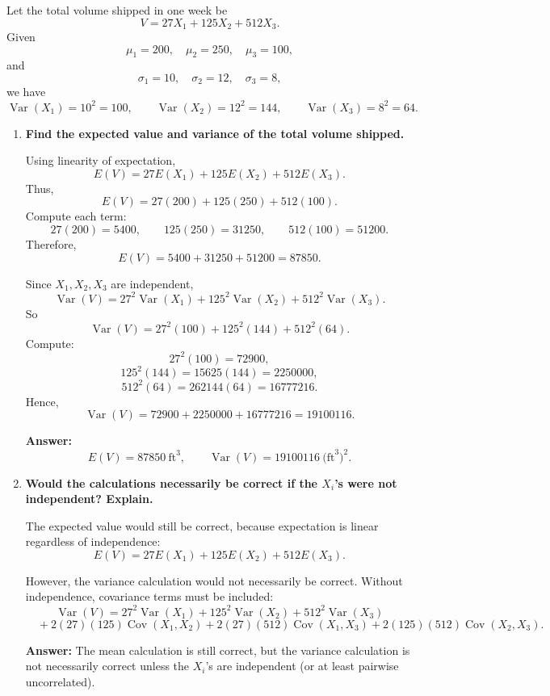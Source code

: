Let the total volume shipped in one week be
\[
V=27X_1+125X_2+512X_3.
\]
Given
\[
\mu_1=200,\quad \mu_2=250,\quad \mu_3=100,
\]
and
\[
\sigma_1=10,\quad \sigma_2=12,\quad \sigma_3=8,
\]
we have
\[
\operatorname{Var}(X_1)=10^2=100,\qquad
\operatorname{Var}(X_2)=12^2=144,\qquad
\operatorname{Var}(X_3)=8^2=64.
\]

\begin{enumerate}
    \item[(a)] \textbf{Find the expected value and variance of the total volume shipped.}

    Using linearity of expectation,
    \[
    E(V)=27E(X_1)+125E(X_2)+512E(X_3).
    \]
    Thus,
    \[
    E(V)=27(200)+125(250)+512(100).
    \]
    Compute each term:
    \[
    27(200)=5400,\qquad 125(250)=31250,\qquad 512(100)=51200.
    \]
    Therefore,
    \[
    E(V)=5400+31250+51200=87850.
    \]

    Since $X_1,X_2,X_3$ are independent,
    \[
    \operatorname{Var}(V)=27^2\operatorname{Var}(X_1)+125^2\operatorname{Var}(X_2)+512^2\operatorname{Var}(X_3).
    \]
    So
    \[
    \operatorname{Var}(V)=27^2(100)+125^2(144)+512^2(64).
    \]
    Compute:
    \[
    27^2(100)=72900,
    \]
    \[
    125^2(144)=15625(144)=2250000,
    \]
    \[
    512^2(64)=262144(64)=16777216.
    \]
    Hence,
    \[
    \operatorname{Var}(V)=72900+2250000+16777216=19100116.
    \]

    \textbf{Answer:}
    \[
    E(V)=87850\ \text{ft}^3,
    \qquad
    \operatorname{Var}(V)=19100116\ \text{(ft}^3)^2.
    \]

    \item[(b)] \textbf{Would the calculations necessarily be correct if the $X_i$'s were not independent? Explain.}

    The expected value would still be correct, because expectation is linear regardless of independence:
    \[
    E(V)=27E(X_1)+125E(X_2)+512E(X_3).
    \]

    However, the variance calculation would not necessarily be correct. Without independence, covariance terms must be included:
    \[
    \operatorname{Var}(V)=27^2\operatorname{Var}(X_1)+125^2\operatorname{Var}(X_2)+512^2\operatorname{Var}(X_3)
    \]
    \[
    \quad +2(27)(125)\operatorname{Cov}(X_1,X_2)
    +2(27)(512)\operatorname{Cov}(X_1,X_3)
    +2(125)(512)\operatorname{Cov}(X_2,X_3).
    \]

    \textbf{Answer:} The mean calculation is still correct, but the variance calculation is not necessarily correct unless the $X_i$'s are independent (or at least pairwise uncorrelated).
\end{enumerate}

